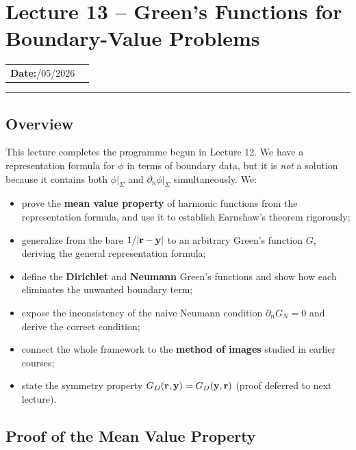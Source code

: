 \section{Lecture 13 -- Green's Functions for Boundary-Value Problems}\label{sec:lec13}

\begin{center}
\begin{tabular}{ll}
  \textbf{Date:}\quad 19/05/2026 & \\
\end{tabular}
\end{center}
\hrule\vspace{1.5em}

\subsection*{Overview}

This lecture completes the programme begun in Lecture 12.  We have a representation
formula for $\phi$ in terms of boundary data, but it is \emph{not} a solution because it
contains both $\phi|_\Sigma$ and $\partial_n\phi|_\Sigma$ simultaneously.  We:
\begin{itemize}
  \item prove the \textbf{mean value property} of harmonic functions from the representation
        formula, and use it to establish Earnshaw's theorem rigorously;
  \item generalize from the bare $1/|\mathbf{r}-\mathbf{y}|$ to an arbitrary Green's function $G$,
        deriving the general representation formula;
  \item define the \textbf{Dirichlet} and \textbf{Neumann} Green's functions and show
        how each eliminates the unwanted boundary term;
  \item expose the inconsistency of the naive Neumann condition $\partial_n G_N = 0$ and
        derive the correct condition;
  \item connect the whole framework to the \textbf{method of images} studied in earlier courses;
  \item state the symmetry property $G_D(\mathbf{r},\mathbf{y}) = G_D(\mathbf{y},\mathbf{r})$
        (proof deferred to next lecture).
\end{itemize}

\subsection{Proof of the Mean Value Property}\label{subsec:lec13-mvp}

